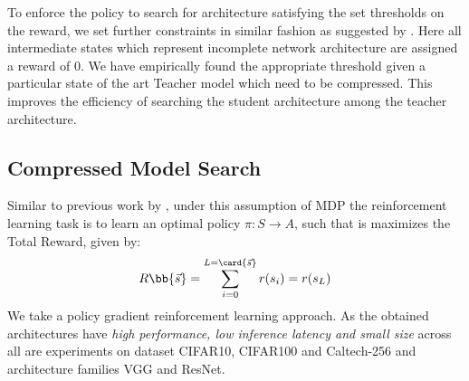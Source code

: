 \documentclass[../main]{subfiles}
\begin{document}
        To enforce the policy to search for architecture satisfying the set thresholds on the reward, we set further constraints in similar fashion as suggested by \cite{ashok2017n2n}.
        Here all intermediate states which represent incomplete network architecture are assigned a reward of 0.
        We have empirically found the appropriate threshold given a particular state of the art Teacher model which need to be compressed.
        This improves the efficiency of searching the student architecture among the teacher architecture.

    \subsection{Compressed Model Search}
        Similar to previous work by \cite{ashok2017n2n}, under this assumption of MDP the reinforcement learning task is to learn an optimal policy $\pi : S \rightarrow A $, such that is maximizes the Total Reward, given by:
        \begin{equation}
            R\bb{\Vec{s}} = \sum_{i=0}^{L=\card{\Vec{s}}} r(s_{i}) = r(s_{L})
        \end{equation}
        We take a policy gradient reinforcement learning approach.
        As the obtained architectures have \textit{high performance, low inference latency and small size} across all are experiments on dataset CIFAR10, CIFAR100 and Caltech-256 and architecture families VGG and ResNet.
\end{document}
